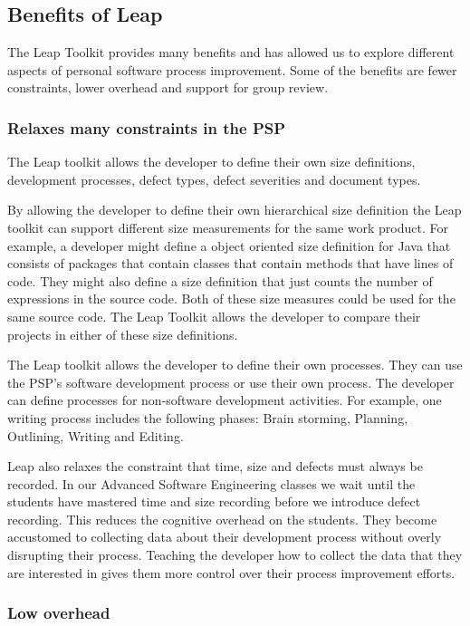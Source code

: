 \subsection{Benefits of Leap}

The Leap Toolkit provides many benefits and has allowed us to explore
different aspects of personal software process improvement.  Some of the
benefits are fewer constraints, lower overhead and support for group review. 

\subsubsection{Relaxes many constraints in the PSP}
The Leap toolkit allows the developer to define their own size definitions,
development processes, defect types, defect severities and document types. 

By allowing the developer to define their own hierarchical size definition the
Leap toolkit can support different size measurements for the same work product.
For example, a developer might define a object oriented size definition for
Java that consists of packages that contain classes that contain methods that
have lines of code. They might also define a size definition that just counts
the number of expressions in the source code.  Both of these size measures
could be used for the same source code.  The Leap Toolkit allows the developer
to compare their projects in either of these size definitions.

The Leap toolkit allows the developer to define their own processes.  They can
use the PSP's software development process or use their own process. The
developer can define processes for non-software development activities.  For
example, one writing process includes the following phases: Brain storming,
Planning, Outlining, Writing and Editing. 

Leap also relaxes the constraint that time, size and defects must always be
recorded.  In our Advanced Software Engineering classes we wait until the
students have mastered time and size recording before we introduce defect
recording.  This reduces the cognitive overhead on the students.  They become
accustomed to collecting data about their development process without overly
disrupting their process.  Teaching the developer how to collect the data that
they are interested in gives them more control over their process improvement
efforts.

\subsubsection{Low overhead}

